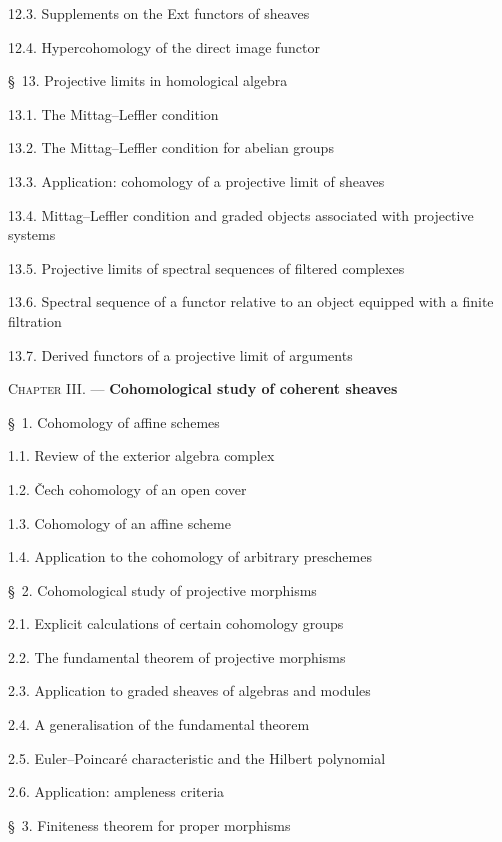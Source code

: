\begin{flushleft}
12.3. Supplements on the Ext functors of sheaves 

12.4. Hypercohomology of the direct image functor 


\S~13. Projective limits in homological algebra 

13.1. The Mittag--Leffler condition 

13.2. The Mittag--Leffler condition for abelian groups 

13.3. Application: cohomology of a projective limit of sheaves 

13.4. Mittag--Leffler condition and graded objects associated with projective
systems 

13.5. Projective limits of spectral sequences of filtered complexes

13.6. Spectral sequence of a functor relative to an object equipped with a
finite filtration 

13.7. Derived functors of a projective limit of arguments 

\medskip
\textsc{Chapter III.} --- \textbf{Cohomological study of coherent sheaves}

\medskip
\S~1. Cohomology of affine schemes 

1.1. Review of the exterior algebra complex 

1.2. \v Cech cohomology of an open cover 

1.3. Cohomology of an affine scheme 

1.4. Application to the cohomology of arbitrary preschemes 

\medskip
\S~2. Cohomological study of projective morphisms 

2.1. Explicit calculations of certain cohomology groups 

2.2. The fundamental theorem of projective morphisms 

2.3. Application to graded sheaves of algebras and modules 

2.4. A generalisation of the fundamental theorem 

2.5. Euler--Poincaré characteristic and the Hilbert polynomial 

2.6. Application: ampleness criteria 

\medskip
\S~3. Finiteness theorem for proper morphisms 


\end{flushleft}
